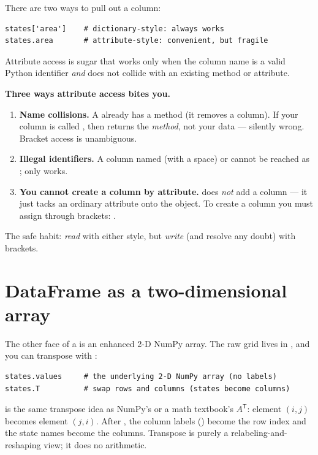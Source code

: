 \documentclass[11pt]{article}
\begin{document}
There are two ways to pull out a column:

\begin{lstlisting}
states['area']    # dictionary-style: always works
states.area       # attribute-style: convenient, but fragile
\end{lstlisting}

Attribute access is sugar that works only when the column name is a valid Python identifier \emph{and} does not collide with an existing  method or attribute.

\begin{pitfall}
\textbf{Three ways attribute access bites you.}
\begin{enumerate}
  \item \textbf{Name collisions.} A  already has a  method (it removes a column). If your column is called , then  returns the \emph{method}, not your data --- silently wrong. Bracket access  is unambiguous.
  \item \textbf{Illegal identifiers.} A column named  (with a space) or  cannot be reached as ; only  works.
  \item \textbf{You cannot create a column by attribute.}  does \emph{not} add a column --- it just tacks an ordinary attribute onto the object. To create a column you must assign through brackets: .
\end{enumerate}
The safe habit: \emph{read} with either style, but \emph{write} (and resolve any doubt) with brackets.
\end{pitfall}

\section{DataFrame as a two-dimensional array}

The other face of a  is an enhanced 2-D NumPy array. The raw grid lives in , and you can transpose with :

\begin{lstlisting}
states.values     # the underlying 2-D NumPy array (no labels)
states.T          # swap rows and columns (states become columns)
\end{lstlisting}

\begin{pyrefresh}
 is the same transpose idea as NumPy's  or a math textbook's $A^{\mathsf{T}}$: element $(i,j)$ becomes element $(j,i)$. After , the column labels () become the row index and the state names become the columns. Transpose is purely a relabeling-and-reshaping view; it does no arithmetic.
\end{pyrefresh}
\end{document}

